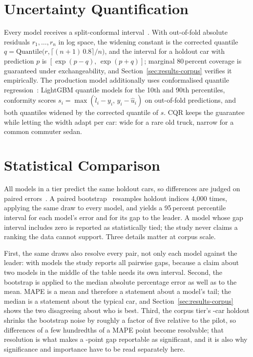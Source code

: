 \documentclass[journal,10pt]{IEEEtran}
\begin{document}
\section{Uncertainty Quantification}
\label{sec:uncertainty}
Every model receives a split-conformal interval~\cite{vovk2005,lei2018}. With out-of-fold absolute residuals $r_1,\dots,r_n$ in log space, the widening constant is the corrected quantile $q=\mathrm{Quantile}\bigl(r,\lceil (n{+}1)\,0.8\rceil/n\bigr)$, and the interval for a holdout car with prediction $p$ is $[\exp(p-q),\,\exp(p+q)]$; marginal 80\,percent coverage is guaranteed under exchangeability, and Section~\ref{sec:results-corpus} verifies it empirically. The production model additionally uses conformalised quantile regression~\cite{romano2019}: LightGBM quantile models for the 10th and 90th percentiles, conformity scores $s_i=\max(\hat{l}_i-y_i,\,y_i-\hat{u}_i)$ on out-of-fold predictions, and both quantiles widened by the corrected quantile of $s$. CQR keeps the guarantee while letting the width adapt per car: wide for a rare old truck, narrow for a common commuter sedan.

\section{Statistical Comparison}
\label{sec:stats}
All models in a tier predict the same holdout cars, so differences are judged on paired errors~\cite{dietterich1998}. A paired bootstrap~\cite{efron1979} resamples holdout indices 4{,}000 times, applying the same draw to every model, and yields a 95\,percent percentile interval for each model's error and for its gap to the leader. A model whose gap interval includes zero is reported as statistically tied; the study never claims a ranking the data cannot support. Three details matter at corpus scale.

First, the same draws also resolve every pair, not only each model against the leader: with \NModels{} models the study reports all \TotalPairs{} pairwise gaps, because a claim about two models in the middle of the table needs its own interval. Second, the bootstrap is applied to the median absolute percentage error as well as to the mean. MAPE is a mean and therefore a statement about a model's tail; the median is a statement about the typical car, and Section~\ref{sec:results-corpus} shows the two disagreeing about who is best. Third, the corpus tier's \NHoldout{}-car holdout shrinks the bootstrap noise by roughly a factor of five relative to the pilot, so differences of a few hundredths of a MAPE point become resolvable; that resolution is what makes a \TextGain{}-point gap reportable as significant, and it is also why significance and importance have to be read separately here.
\end{document}

